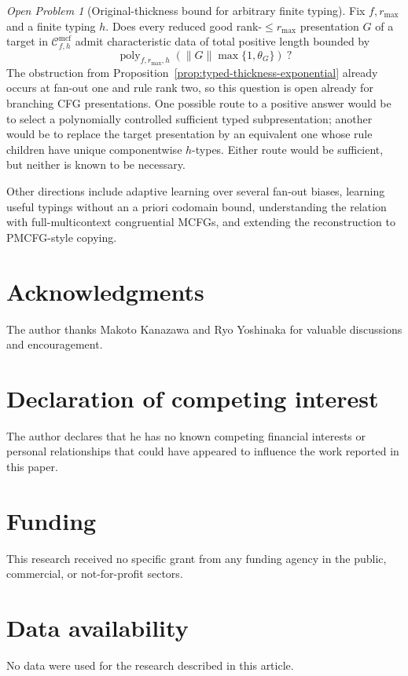 \documentclass[11pt]{article}
\numberwithin{equation}{section}
\theoremstyle{plain}
\theoremstyle{definition}
\theoremstyle{remark}
\newtheorem{openproblem}[theorem]{Open Problem}
\newcommand{\Cmcf}[2]{\mathcal{C}^{\mathrm{mcf}}_{#1,#2}}
\begin{document}
\begin{openproblem}[Original-thickness bound for arbitrary finite typing]
Fix $f,r_{\max}$ and a finite typing $h$.  Does every reduced good
rank-$\le r_{\max}$ presentation $G$ of a target in $\Cmcf{f}{h}$ admit
characteristic data of total positive length bounded by
\[
  \operatorname{poly}_{f,r_{\max},h}
  (\|G\|\max\{1,\theta_G\})\ ?
\]
The obstruction from Proposition~\ref{prop:typed-thickness-exponential} already
occurs at fan-out one and rule rank two, so this question is open already for
branching CFG presentations.  One possible route to a positive answer would be
to select a polynomially controlled sufficient typed subpresentation; another
would be to replace the target presentation by an equivalent one whose rule
children have unique componentwise $h$-types.  Either route would be
sufficient, but neither is known to be necessary.
\end{openproblem}

Other directions include adaptive learning over several fan-out biases, learning
useful typings without an a priori codomain bound, understanding the relation
with full-multicontext congruential MCFGs, and extending the reconstruction to
PMCFG-style copying.

\section*{Acknowledgments}
The author thanks Makoto Kanazawa and Ryo Yoshinaka for valuable discussions
and encouragement.

\section*{Declaration of competing interest}
The author declares that he has no known competing financial interests or
personal relationships that could have appeared to influence the work reported
in this paper.

\section*{Funding}
This research received no specific grant from any funding agency in the public,
commercial, or not-for-profit sectors.

\section*{Data availability}
No data were used for the research described in this article.
\end{document}
